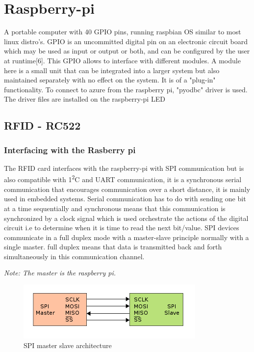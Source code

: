  
\section{Raspberry-pi}
A portable computer with 40 GPIO pins, running raspbian OS similar to most linux distro's. 
GPIO is an uncommitted digital pin on an electronic circuit board which may be used as input or output or both, and can be configured by the user at runtime[6]. This GPIO allows to interface with different modules. A module here is a small unit that can be integrated into a larger system but also maintained separately with no effect on the system. It is of a "plug-in" functionality.
To connect to azure from the raspberry pi, "pyodbc" driver is used. The driver files are installed on the raspberry-pi
LED  


\subsection{RFID - RC522}
\subsubsection{Interfacing with the Rasberry pi}
The RFID card interfaces with the raspberry-pi with SPI communication but is also compatible with 1\textsuperscript{2}C and UART communication, it is a synchronous serial communication that encourages communication over a short distance, it is mainly used in embedded systems. Serial communication has to do with sending one bit at a time sequentially and synchronous means that this communication is synchronized by a clock signal which is used orchestrate the actions of the digital circuit i.e to determine when it is time to read the next bit/value. SPI devices communicate in a full duplex mode with a master-slave principle normally with a single master. full duplex means that data is transmitted back and forth simultaneously in this communication channel.

\textit{Note: The master is the raspberry pi.}
\vspace{1cm}
\begin{figure}[h]
  \includegraphics{Background/images/350px-SPI_single_slave.svg.png.png}
  \caption{SPI master slave architecture}
\end{figure}

